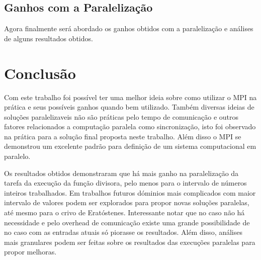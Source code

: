 \documentclass{article}
\begin{document}
\subsection{Ganhos com a Paralelização}

Agora finalmente será abordado os ganhos obtidos com a paralelização e análises de alguns resultados obtidos.

\section{Conclusão}

Com este trabalho foi possível ter uma melhor ideia sobre como utilizar o MPI na prática e seus possíveis ganhos quando bem utilizado. Também diversas ideias de soluções paralelizaveis não são práticas pelo tempo de comunicação e outros fatores relacionados a computação paralela como sincronização, isto foi observado na prática para a solução final proposta neste trabalho. Além disso o MPI se demonstrou um excelente padrão para definição de um sistema computacional em paralelo.

Os resultados obtidos demonstraram que há mais ganho na paralelização da tarefa da execução da função divisora, pelo menos para o intervalo de números inteiros trabalhados. Em trabalhos futuros dóminios mais complicados com maior intervalo de valores podem ser explorados para propor novas soluções paralelas, até mesmo para o crivo de Eratóstenes. Interessante notar que no caso não há necessidade e pelo overhead de comunicação existe uma grande possibilidade de no caso com as entradas atuais só piorasse os resultados. Além disso, análises mais granulares podem ser feitas sobre os  resultados das execuções paralelas para propor melhoras.



\end{document}
